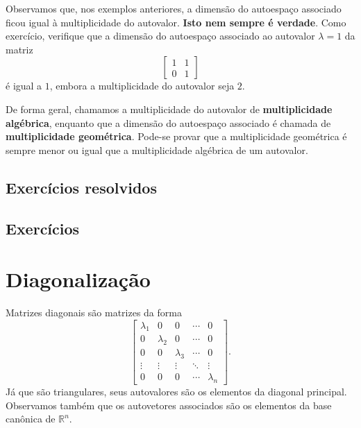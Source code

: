 Observamos que, nos exemplos anteriores, a dimensão do autoespaço associado ficou igual à multiplicidade do autovalor. \textbf{Isto nem sempre é verdade}. Como exercício, verifique que a dimensão do autoespaço associado ao autovalor $\lambda = 1$ da matriz
\begin{equation}
\begin{bmatrix}
1 & 1 \\
0 & 1
\end{bmatrix}
\end{equation} é igual a $1$, embora a multiplicidade do autovalor seja $2$.

De forma geral, chamamos a multiplicidade do autovalor de \textbf{multiplicidade algébrica}, enquanto que a dimensão do autoespaço associado é chamada de \textbf{multiplicidade geométrica}. Pode-se provar que a multiplicidade geométrica é sempre menor ou igual que a multiplicidade algébrica de um autovalor.

\subsection*{Exercícios resolvidos}

\construirExeresol

\subsection*{Exercícios}

\construirExer

\section{Diagonalização}

Matrizes diagonais são matrizes da forma
\begin{equation}
\begin{bmatrix}
\lambda_1 & 0 & 0 & \cdots & 0 \\
0 & \lambda_2 & 0 & \cdots & 0 \\
0 & 0 & \lambda_3 & \cdots & 0 \\
\vdots & \vdots & \vdots & \ddots & \vdots \\
0 & 0 & 0 & \cdots & \lambda_n
\end{bmatrix}.
\end{equation} Já que são triangulares, seus autovalores são os elementos da diagonal principal. Observamos também que os autovetores associados são os elementos da base canônica de $\mathbb{R}^n$.

